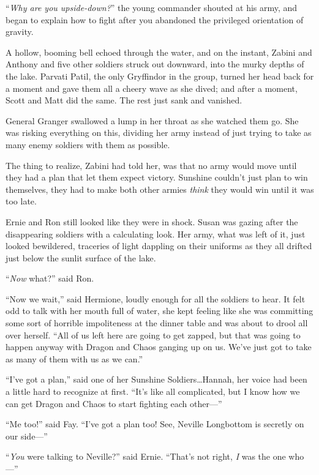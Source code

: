 “\emph{Why are you upside-down?}” the young commander shouted at his army, and began to explain how to fight after you abandoned the privileged orientation of gravity.

\later

A hollow, booming bell echoed through the water, and on the instant, Zabini and Anthony and five other soldiers struck out downward, into the murky depths of the lake. Parvati Patil, the only Gryffindor in the group, turned her head back for a moment and gave them all a cheery wave as she dived; and after a moment, Scott and Matt did the same. The rest just sank and vanished.

General Granger swallowed a lump in her throat as she watched them go. She was risking everything on this, dividing her army instead of just trying to take as many enemy soldiers with them as possible.

The thing to realize, Zabini had told her, was that no army would move until they had a plan that let them expect victory. Sunshine couldn’t just plan to win themselves, they had to make both other armies \emph{think} they would win until it was too late.

Ernie and Ron still looked like they were in shock. Susan was gazing after the disappearing soldiers with a calculating look. Her army, what was left of it, just looked bewildered, traceries of light dappling on their uniforms as they all drifted just below the sunlit surface of the lake.

“\emph{Now} what?” said Ron.

“Now we wait,” said Hermione, loudly enough for all the soldiers to hear. It felt odd to talk with her mouth full of water, she kept feeling like she was committing some sort of horrible impoliteness at the dinner table and was about to drool all over herself. “All of us left here are going to get zapped, but that was going to happen anyway with Dragon and Chaos ganging up on us. We’ve just got to take as many of them with us as we can.”

“I’ve got a plan,” said one of her Sunshine Soldiers…Hannah, her voice had been a little hard to recognize at first. “It’s like all complicated, but I know how we can get Dragon and Chaos to start fighting each other—”

“Me too!” said Fay. “I’ve got a plan too! See, Neville Longbottom is secretly on our side—”

“\emph{You} were talking to Neville?” said Ernie. “That’s not right, \emph{I} was the one who—”

